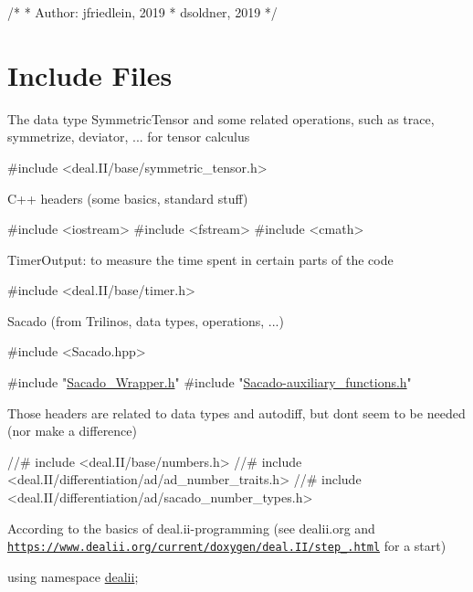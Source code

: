 \begin{DoxyCode}
\textcolor{comment}{/*}
\textcolor{comment}{ * Author: jfriedlein, 2019}
\textcolor{comment}{ *      dsoldner, 2019}
\textcolor{comment}{ */}
\end{DoxyCode}
 \hypertarget{index_includes}{}\section{Include Files}\label{index_includes}
The data type Symmetric\+Tensor and some related operations, such as trace, symmetrize, deviator, ... for tensor calculus 
\begin{DoxyCode}
\textcolor{preprocessor}{#include <deal.II/base/symmetric\_tensor.h>}
\end{DoxyCode}
 C++ headers (some basics, standard stuff) 
\begin{DoxyCode}
\textcolor{preprocessor}{#include <iostream>}
\textcolor{preprocessor}{#include <fstream>}
\textcolor{preprocessor}{#include <cmath>}
\end{DoxyCode}
 Timer\+Output\+: to measure the time spent in certain parts of the code 
\begin{DoxyCode}
\textcolor{preprocessor}{#include <deal.II/base/timer.h>}
\end{DoxyCode}
 Sacado (from Trilinos, data types, operations, ...) 
\begin{DoxyCode}
\textcolor{preprocessor}{#include <Sacado.hpp>}
 
\textcolor{preprocessor}{#include "\hyperlink{Sacado__Wrapper_8h}{Sacado\_Wrapper.h}"}
\textcolor{preprocessor}{#include "\hyperlink{Sacado-auxiliary__functions_8h}{Sacado-auxiliary\_functions.h}"}
\end{DoxyCode}
 Those headers are related to data types and autodiff, but don\textquotesingle{}t seem to be needed (nor make a difference) 
\begin{DoxyCode}
\textcolor{comment}{//#  include <deal.II/base/numbers.h>}
\textcolor{comment}{//#  include <deal.II/differentiation/ad/ad\_number\_traits.h>}
\textcolor{comment}{//#  include <deal.II/differentiation/ad/sacado\_number\_types.h>}
\end{DoxyCode}
 According to the basics of deal.\+ii-\/programming (see dealii.\+org and \href{https://www.dealii.org/current/doxygen/deal.II/step_1.html}{\tt https\+://www.\+dealii.\+org/current/doxygen/deal.\+I\+I/step\+\_.\+html} for a start) 
\begin{DoxyCode}
\textcolor{keyword}{using namespace }\hyperlink{namespacedealii}{dealii};
\end{DoxyCode}
